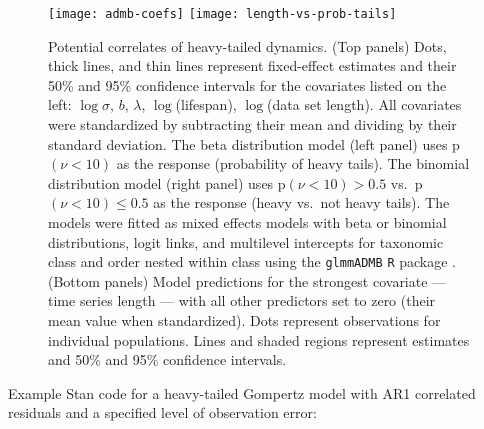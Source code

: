 \documentclass[12pt]{article}
\begin{document}
\clearpage


\begin{figure}[htbp]
\begin{center}
\texttt{[image: admb-coefs]}
\texttt{[image: length-vs-prob-tails]}
\caption{Potential correlates of heavy-tailed dynamics.
  (Top panels) Dots, thick lines, and thin lines represent fixed-effect estimates and their 50\% and 95\% confidence intervals for the covariates listed on the left: $\log \sigma$, $b$, $\lambda$, $\log$(lifespan), $\log$(data set length). All covariates were standardized by subtracting their mean and dividing by their standard deviation.
  The beta distribution model (left panel) uses p$(\nu < 10)$ as the response (probability of heavy tails).
  The binomial distribution model (right panel) uses p$(\nu < 10) > 0.5$ vs.\ p$(\nu < 10) \le 0.5$ as the response (heavy vs.\ not heavy tails).
  The models were fitted as mixed effects models with beta or binomial distributions, logit links, and multilevel intercepts for taxonomic class and order nested within class using the \texttt{glmmADMB} \texttt{R} package \citep{fournier2012,glmmadmb}.
  (Bottom panels) Model predictions for the strongest covariate --- time series length --- with all other predictors set to zero (their mean value when standardized). Dots represent observations for individual populations. Lines and shaded regions represent estimates and 50\% and 95\% confidence intervals.
}
    \label{fig:correlate-coefs}
\end{center}
\end{figure}

%

\clearpage

\noindent
Example Stan code for a heavy-tailed Gompertz model with AR1 correlated residuals and a specified level of observation error:
\end{document}
